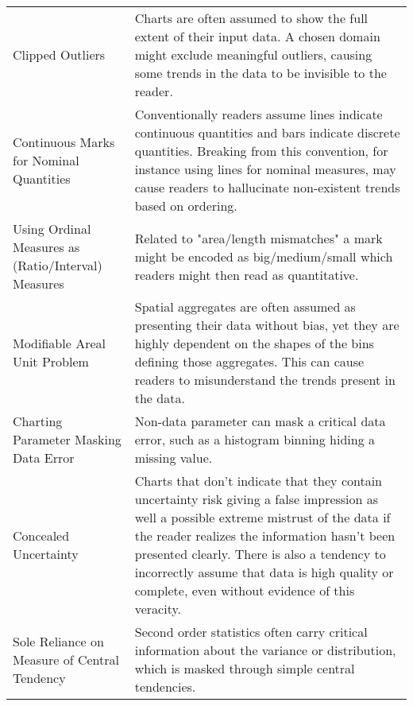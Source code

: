 \begin{longtable}{p{3cm}p{14cm}}
 \rowcolor{colorc-opaque}Clipped Outliers  & Charts are often assumed to show the full extent of their input data. A chosen domain might exclude meaningful outliers, causing some trends in the data to be invisible to the reader. \\
 \rowcolor{colorc}Continuous Marks for Nominal Quantities  & Conventionally readers assume lines indicate continuous quantities and bars indicate discrete quantities. Breaking from this convention, for instance using lines for nominal measures, may cause readers to hallucinate non-existent trends based on ordering.  \cite{mcnuttlinting, zacks1999bars}\\
 \rowcolor{colorc-opaque}Using Ordinal Measures as (Ratio/Interval) Measures & Related to "area/length mismatches" a mark might be encoded as big/medium/small which readers might then read as quantitative. \cite{stevens1946theory, few2019loom}\\
 \rowcolor{colorc}Modifiable Areal Unit Problem  & Spatial aggregates are often assumed as presenting their data without bias, yet they are highly dependent on the shapes of the bins defining those aggregates. This can cause readers to misunderstand the trends present in the data. \cite{fotheringham1991modifiable, kindlmann2014algebraic}\\
 \rowcolor{colorc-opaque}Charting Parameter Masking Data Error & Non-data parameter can mask a critical data error, such as a histogram binning hiding a missing value. \cite{correll2018looks}\\
 \rowcolor{colorc}Concealed \newline Uncertainty  & Charts that don't indicate that they contain uncertainty risk giving a false impression as well a possible extreme mistrust of the data if the reader realizes the information hasn't been presented clearly. There is also a tendency to incorrectly assume that data is high quality or complete, even without evidence of this veracity. \cite{song2018s, few2019loom, mayrTrust2019, sacha2015role}\\
 \rowcolor{colorc-opaque}Sole Reliance on Measure of Central Tendency & Second order statistics often carry critical information about the variance or distribution, which is masked through simple central tendencies.  \cite{wall2017warning, few2019loom, matejka2017same, anscombe1973graphs}\\

\end{longtable}
